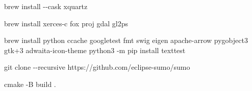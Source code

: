\documentclass[
  letterpaper,
  DIV=11,
  numbers=noendperiod]{scrreprt}
\newenvironment{Shaded}{\begin{snugshade}}{\end{snugshade}}
\newcommand{\AttributeTok}[1]{\textcolor[rgb]{0.40,0.45,0.13}{#1}}
\newcommand{\BuiltInTok}[1]{\textcolor[rgb]{0.00,0.23,0.31}{#1}}
\newcommand{\ExtensionTok}[1]{\textcolor[rgb]{0.00,0.23,0.31}{#1}}
\newcommand{\FunctionTok}[1]{\textcolor[rgb]{0.28,0.35,0.67}{#1}}
\newcommand{\NormalTok}[1]{\textcolor[rgb]{0.00,0.23,0.31}{#1}}
\newcommand{\OperatorTok}[1]{\textcolor[rgb]{0.37,0.37,0.37}{#1}}
\newcommand{\StringTok}[1]{\textcolor[rgb]{0.13,0.47,0.30}{#1}}
\newcommand{\VariableTok}[1]{\textcolor[rgb]{0.07,0.07,0.07}{#1}}
\begin{document}
\begin{Shaded}
\begin{Highlighting}[]
\ExtensionTok{brew}\NormalTok{ install }\AttributeTok{{-}{-}cask}\NormalTok{ xquartz}
\end{Highlighting}
\end{Shaded}

\begin{Shaded}
\begin{Highlighting}[]
\ExtensionTok{brew}\NormalTok{ install xerces{-}c fox proj gdal gl2ps}
\end{Highlighting}
\end{Shaded}

\begin{Shaded}
\begin{Highlighting}[]
\NormalTok{brew install python ccache googletest fmt swig eigen apache{-}arrow pygobject3 gtk+3 adwaita{-}icon{-}theme python3 {-}m pip install texttest}
\end{Highlighting}
\end{Shaded}

\begin{Shaded}
\begin{Highlighting}[]
\FunctionTok{git}\NormalTok{ clone }\AttributeTok{{-}{-}recursive}\NormalTok{ https://github.com/eclipse{-}sumo/sumo }
\end{Highlighting}
\end{Shaded}

\begin{Shaded}
\end{Shaded}

\begin{Shaded}
\end{Shaded}

\begin{Shaded}
\begin{Highlighting}[]
\FunctionTok{cmake} \AttributeTok{{-}B}\NormalTok{ build .}
\end{Highlighting}
\end{Shaded}

\begin{Shaded}
\end{Shaded}
\end{document}
